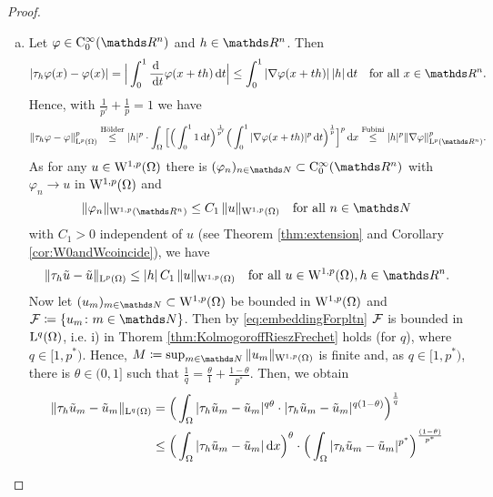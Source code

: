 \begin{proof}
  \begin{enumerate}[a)]
    \item Let $\varphi \in \CC_0^\infty(\R^n)$ and $h \in \R^n$.
      Then
      $$
      |\tau_h \varphi(x) - \varphi(x)|
      = \Big|\int_0^1 \frac{\d\ }{\d t} \varphi(x + th) \d t \Big|
      \leq \int_0^1 |\nabla\varphi(x + th)| \, |h| \d t \quad\text{for all } x \in \R^n.
      $$
      Hence, with $\frac{1}{p'} + \frac{1}{p} = 1$ we have
      $$
      \|\tau_h \varphi - \varphi \|_{\Ell^p(\Omega)}^p 
      \overset{\text{Hölder}}{\leq} |h|^p \cdot \int_\Omega \Big[ \Big( \int_0^1 1 \d t \Big)^{\frac{1}{p'}} \Big( \int_0^1 |\nabla\varphi(x + th)|^p \d t \Big)^{\frac{1}{p}} \Big]^p \d x
      \overset{\text{Fubini}}{\leq} |h|^p \|\nabla\varphi\|_{\Ell^p(\R^n)}^p.
      $$
      As for any $u \in \mathrm{W}^{1,p}(\Omega)$ there is $(\varphi_n)_{n \in \N} \subset \CC_0^\infty(\R^n)$ with $\varphi_n \to u$ in $\mathrm{W}^{1,p}(\Omega)$ and
      $$
      \|\varphi_n\|_{\WW^{1,p}(\R^n)} \leq C_1 \, \|u\|_{\WW^{1,p}(\Omega)} \quad\text{for all } n \in \N
      $$
      with $C_1 > 0$ independent of $u$ (see Theorem \ref{thm:extension} and Corollary \ref{cor:W0andWcoincide}), we have
      \begin{equation}
        \label{eq:translationEstimate}
        \|\tau_h \tilde u - \tilde u\|_{\Ell^p(\Omega)} \leq |h| \, C_1 \, \|u\|_{\WW^{1,p}(\Omega)} \quad\text{for all } u \in \WW^{1,p}(\Omega), h \in \R^n.
      \end{equation}
      Now let $(u_m)_{m \in \N} \subset \WW^{1,p}(\Omega)$ be bounded in $\mathrm{W}^{1,p}(\Omega)$ and $\FF \coloneqq \{ u_m \colon m \in \N\}$.
      Then by \eqref{eq:embeddingForpltn} $\mathcal{F}$ is bounded in $\mathrm{L}^q(\Omega)$, i.e. i) in Thorem \ref{thm:KolmogoroffRieszFrechet} holds (for $q$), where $q \in [1,p^*)$.
        Hence, $M \coloneqq \sup_{m \in \N} \|u_m\|_{\WW^{1,p}(\Omega)}$ is finite and, as $q \in [1,p^*)$, there is $\theta \in (0,1]$ such that $\frac{1}{q} = \frac{\theta}{1} + \frac{1 - \theta}{p^*}$.
        Then, we obtain
        \begin{align*}
        \|\tau_h \tilde u_m - \tilde u_m \|_{\Ell^q(\Omega)}
        &= \Big( \int_\Omega |\tau_h \tilde u_m - \tilde u_m |^{q\theta}\cdot |\tau_h \tilde u_m - \tilde u_m |^{q(1 - \theta)} \Big)^{\frac{1}{q}} \\
        &\leq \Big( \int_\Omega |\tau_h \tilde u_m - \tilde u_m |\d x \Big)^\theta \cdot \Big( \int_\Omega |\tau_h \tilde u_m - \tilde u_m |^{p^*} \Big)^{\frac{(1 - \theta)}{p^*}}

\end{align*}
\end{enumerate}
\end{proof}
